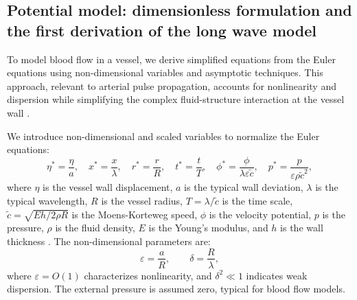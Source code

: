 \documentclass[alpha-refs, 12pt]{wiley-article}
\newcommand{\eps}{\varepsilon}
\begin{document}
\subsection{Potential model: dimensionless formulation and the first derivation of the long wave model}\label{sec:dimless_longwave}

To model blood flow in a vessel, we derive simplified equations from the Euler equations using non-dimensional variables and asymptotic techniques. This approach, relevant to arterial pulse propagation, accounts for nonlinearity and dispersion while simplifying the complex fluid-structure interaction at the vessel wall \cite{Fung1993}.

We introduce non-dimensional and scaled variables to normalize the Euler equations:
\begin{equation}\label{eq:ndv}
  \eta^* = \frac{\eta}{a}, \quad x^* = \frac{x}{\lambda}, \quad r^* = \frac{r}{R}, \quad t^* = \frac{t}{T}, \quad \phi^* = \frac{\phi}{\lambda \varepsilon \tilde{c}}, \quad p^* = \frac{p}{\varepsilon \rho \tilde{c}^2},
\end{equation}
where $\eta$ is the vessel wall displacement, $a$ is the typical wall deviation, $\lambda$ is the typical wavelength, $R$ is the vessel radius, $T = \lambda / \tilde{c}$ is the time scale, $\tilde{c} = \sqrt{E h / 2 \rho R}$ is the Moens-Korteweg speed, $\phi$ is the velocity potential, $p$ is the pressure, $\rho$ is the fluid density, $E$ is the Young's modulus, and $h$ is the wall thickness \cite{Fung1993}. The non-dimensional parameters are:
\begin{equation}\label{eq:parameters}
  \eps = \frac{a}{R}, \qquad \delta = \frac{R}{\lambda},
\end{equation}
where $\eps = O(1)$ characterizes nonlinearity, and $\delta^2 \ll 1$ indicates weak dispersion. The external pressure is assumed zero, typical for blood flow models.
\end{document}
